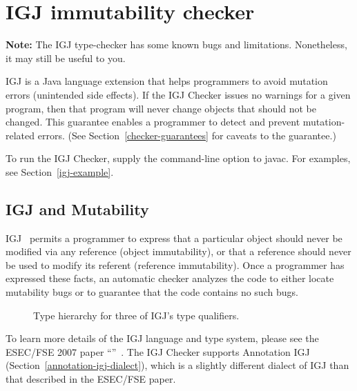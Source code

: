 \htmlhr
\chapter{IGJ immutability checker\label{igj-checker}}
\label{oigj-checker}

\textbf{Note:} The IGJ type-checker has some known bugs and limitations.
Nonetheless, it may still be useful to you.

IGJ is a Java language extension that helps programmers to avoid mutation errors
(unintended side effects).
If the IGJ Checker issues no warnings for a given program, then that program
will never change objects that should not be changed.  This guarantee
enables a programmer to detect and prevent mutation-related errors.
(See Section~\ref{checker-guarantees} for caveats to the guarantee.)

To run the IGJ Checker, supply the 
command-line option to javac.  For examples, see Section~\ref{igj-example}.


\section{IGJ and Mutability\label{igj-and-mutability}}

IGJ~\cite{ZibinPAAKE2007} permits a
programmer to express that a particular object should never be modified via any
reference (object immutability), or that a reference should never be used to
modify its referent (reference immutability). Once a programmer has expressed
these facts, an automatic checker analyzes the code to either locate mutability
bugs or to guarantee that the code contains no such bugs.

\begin{figure}
\caption{Type hierarchy for three of IGJ's type qualifiers.}
\label{fig-igj-hierarchy}
\end{figure}

To learn more details of the IGJ language and type system, please see the
ESEC/FSE 2007 paper ``''~\cite{ZibinPAAKE2007}.
The IGJ Checker supports Annotation IGJ (Section~\ref{annotation-igj-dialect}),
which is a slightly different dialect
of IGJ than that described in the ESEC/FSE paper.


